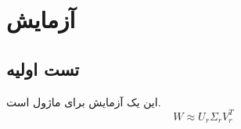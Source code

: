 \documentclass[12pt,a4paper]{report}
\begin{document}
\chapter{آزمایش}
\section*{تست اولیه}
این یک آزمایش برای ماژول  است.
\[
W \approx U_r \Sigma_r V_r^T
\]
\end{document}
